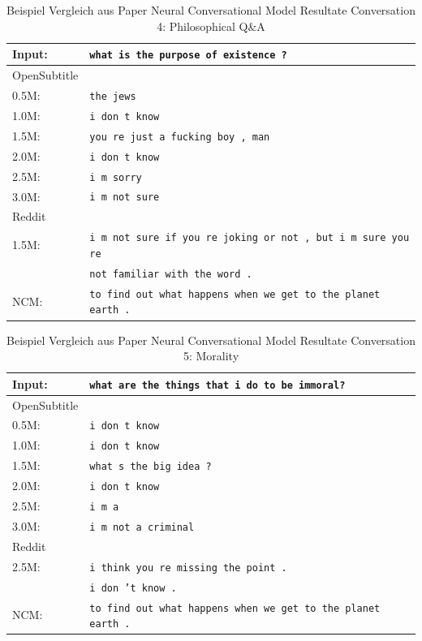 \begin{table}[H]
	\centering
	\begin{adjustbox}{max width=\textwidth}
		\begin{tabular}{ll}
			\toprule
			Input: 	& \texttt{what is the purpose of existence ?}\\
			\midrule
			OpenSubtitle\\
			0.5M: 	& \texttt{the jews}\\
			1.0M: 	& \texttt{i don t know}\\
			1.5M:	& \texttt{you re just a fucking boy , man}\\
			2.0M:	& \texttt{i don t know}\\
			2.5M:	& \texttt{i m sorry}\\
			3.0M:	& \texttt{i m not sure}\\
			\midrule
			Reddit\\
			1.5M:	& \texttt{i m not sure if you re joking or not , but i m sure you re }\\
			& \texttt{not familiar with the word .}\\
			\midrule
			NCM:	& \texttt{to find out what happens when we get to the planet earth .}\\
			\bottomrule
		\end{tabular}
	\end{adjustbox}
	\caption{Beispiel Vergleich aus Paper Neural Conversational Model Resultate Conversation 4: Philosophical Q\&A}
	\label{results:example13_output: Neural_Conversational_Model_compared}
\end{table}
\begin{table}[H]
	\centering
	\begin{adjustbox}{max width=\textwidth}
		\begin{tabular}{ll}
			\toprule
			Input: 	& \texttt{what are the things that i do to be immoral?}\\
			\midrule
			OpenSubtitle\\
			0.5M: 	& \texttt{i don t know}\\
			1.0M: 	& \texttt{i don t know}\\
			1.5M:	& \texttt{what s the big idea ?}\\
			2.0M:	& \texttt{i don t know}\\
			2.5M:	& \texttt{i m a}\\
			3.0M:	& \texttt{i m not a criminal}\\
			\midrule
			Reddit\\
			2.5M:	& \texttt{i think you re missing the point .}\\
			& \texttt{i don ’t know .}\\
			\midrule
			NCM:	& \texttt{to find out what happens when we get to the planet earth .}\\
			\bottomrule
		\end{tabular}
	\end{adjustbox}
	\caption{Beispiel Vergleich aus Paper Neural Conversational Model Resultate Conversation 5: Morality}
	\label{results:example14_output: Neural_Conversational_Model_compared}
\end{table}

